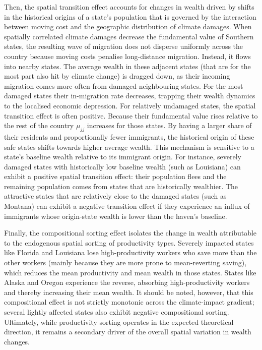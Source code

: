 \documentclass[12pt, a4paper]{article}
\begin{document}
Then, the spatial transition effect accounts for changes in wealth driven by shifts in the historical origins of a state's population that is governed by the interaction between moving cost and the geographic distribution of climate damages. When spatially correlated climate damages decrease the fundamental value of Southern states, the resulting wave of migration does not disperse uniformly across the country because moving costs penalise long-distance migration. Instead, it flows into nearby states. The average wealth in these adjacent states (that are for the most part also hit by climate change) is dragged down, as their incoming migration comes more often from damaged neighbouring states. For the most damaged states their in-migration rate decreases, trapping their wealth dynamics to the localised economic depression. For relatively undamaged states, the spatial transition effect is often positive. Because their fundamental value rises relative to the rest of the country $\mu_{jj}$ increases for those states. By having a larger share of their  residents and proportionally fewer immigrants, the historical origin of these safe states shifts towards higher average wealth. This mechanism is sensitive to a state's baseline wealth relative to its immigrant origin. For instance, severely damaged states with historically low baseline wealth (such as Louisiana) can exhibit a positive spatial transition effect: their population flees and the remaining population comes from states that are historically wealthier. The attractive states that are relatively close to the damaged states (such as Montana) can exhibit a negative transition effect if they experience an influx of immigrants whose origin-state wealth is lower than the haven's baseline.

Finally, the compositional sorting effect isolates the change in wealth attributable to the endogenous spatial sorting of productivity types. Severely impacted states like Florida and Louisiana lose high-productivity workers who save more than the other workers (mainly because they are more prone to mean-reverting saving), which reduces the mean productivity and mean wealth in those states. States like Alaska and Oregon experience the reverse, absorbing high-productivity workers and thereby increasing their mean wealth. It should be noted, however, that this compositional effect is not strictly monotonic across the climate-impact gradient; several lightly affected states also exhibit negative compositional sorting. Ultimately, while productivity sorting operates in the expected theoretical direction, it remains a secondary driver of the overall spatial variation in wealth changes.

\end{document}
